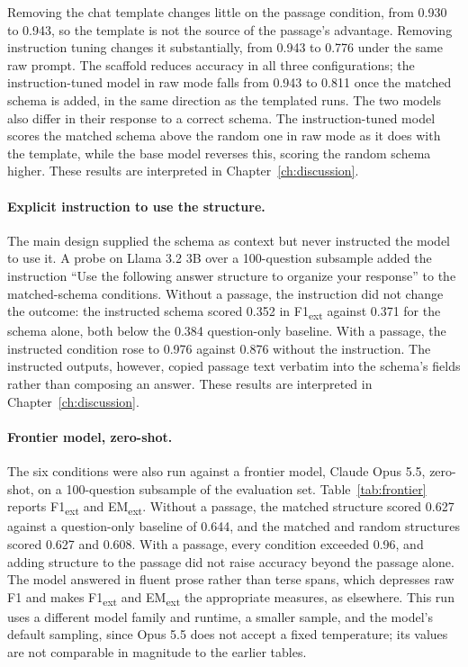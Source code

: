 \documentclass[master]{thesis}
\newcommand{\cref}[1]{Chapter~\ref{#1}}  %
\begin{document}
Removing the chat template changes little on the passage condition, from 0.930 to 0.943, so the template is not the source of the passage's advantage. Removing instruction tuning changes it substantially, from 0.943 to 0.776 under the same raw prompt. The scaffold reduces accuracy in all three configurations; the instruction-tuned model in raw mode falls from 0.943 to 0.811 once the matched schema is added, in the same direction as the templated runs. The two models also differ in their response to a correct schema. The instruction-tuned model scores the matched schema above the random one in raw mode as it does with the template, while the base model reverses this, scoring the random schema higher. These results are interpreted in \cref{ch:discussion}.

\paragraph{Explicit instruction to use the structure.}
The main design supplied the schema as context but never instructed the model to use it. A probe on Llama 3.2 3B over a 100-question subsample added the instruction ``Use the following answer structure to organize your response'' to the matched-schema conditions. Without a passage, the instruction did not change the outcome: the instructed schema scored 0.352 in F1\textsubscript{ext} against 0.371 for the schema alone, both below the 0.384 question-only baseline. With a passage, the instructed condition rose to 0.976 against 0.876 without the instruction. The instructed outputs, however, copied passage text verbatim into the schema's fields rather than composing an answer. These results are interpreted in \cref{ch:discussion}.

\paragraph{Frontier model, zero-shot.}
The six conditions were also run against a frontier model, Claude Opus 5.5, zero-shot, on a 100-question subsample of the evaluation set. Table~\ref{tab:frontier} reports F1\textsubscript{ext} and EM\textsubscript{ext}. Without a passage, the matched structure scored 0.627 against a question-only baseline of 0.644, and the matched and random structures scored 0.627 and 0.608. With a passage, every condition exceeded 0.96, and adding structure to the passage did not raise accuracy beyond the passage alone. The model answered in fluent prose rather than terse spans, which depresses raw F1 and makes F1\textsubscript{ext} and EM\textsubscript{ext} the appropriate measures, as elsewhere. This run uses a different model family and runtime, a smaller sample, and the model's default sampling, since Opus 5.5 does not accept a fixed temperature; its values are not comparable in magnitude to the earlier tables.
\end{document}
